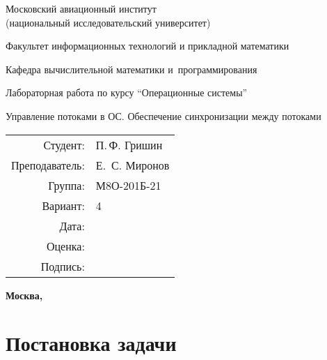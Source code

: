 \documentclass[pdf, unicode, 12pt, a4paper,oneside,fleqn]{article}
\begin{document}
\begin{titlepage}
    \begin{center}
        \bfseries

        {\Large Московский авиационный институт\\ (национальный исследовательский университет)}
        
        \vspace{48pt}
        
        {\large Факультет информационных технологий и прикладной математики}
        
        \vspace{36pt}
        
        {\large Кафедра вычислительной математики и~программирования}
        
        \vspace{48pt}
        
        Лабораторная работа  по курсу \enquote{Операционные системы}

        \vspace{48pt}

        Управление потоками в ОС. Обеспечение синхронизации между потоками
    \end{center}
    
    \vspace{140pt}
    
    \begin{flushright}
    \begin{tabular}{rl}
    Студент: & П.\,Ф. Гришин \\
    Преподаватель: & Е. \,С. Миронов \\
    Группа: & М8О-201Б-21 \\
    Вариант: & 4 \\
    Дата: & \\
    Оценка: & \\
    Подпись: & \\
    \end{tabular}
    \end{flushright}
    
    \vfill
    
    \begin{center}
    \bfseries
    Москва, \the\year
    \end{center}
\end{titlepage}
    
\pagebreak

\section{Постановка задачи}
\end{document}
